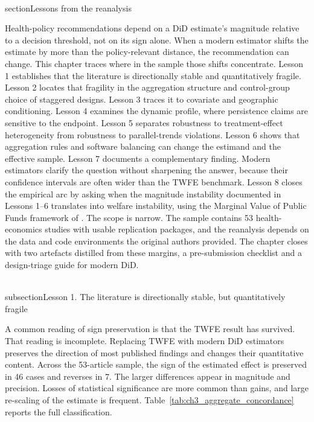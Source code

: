 \documentclass[11pt]{article}
\begin{document}
\\section{Lessons from the reanalysis}
\label{Chapter4}

Health-policy recommendations depend on a DiD estimate's magnitude relative to a decision threshold, not on its sign alone. When a modern estimator shifts the estimate by more than the policy-relevant distance, the recommendation can change. This chapter traces where in the sample those shifts concentrate. Lesson 1 establishes that the literature is directionally stable and quantitatively fragile. Lesson 2 locates that fragility in the aggregation structure and control-group choice of staggered designs. Lesson 3 traces it to covariate and geographic conditioning. Lesson 4 examines the dynamic profile, where persistence claims are sensitive to the endpoint. Lesson 5 separates robustness to treatment-effect heterogeneity from robustness to parallel-trends violations. Lesson 6 shows that aggregation rules and software balancing can change the estimand and the effective sample. Lesson 7 documents a complementary finding. Modern estimators clarify the question without sharpening the answer, because their confidence intervals are often wider than the TWFE benchmark. Lesson 8 closes the empirical arc by asking when the magnitude instability documented in Lessons 1--6 translates into welfare instability, using the Marginal Value of Public Funds framework of \textcite{hendren2020unified}. The scope is narrow. The sample contains 53 health-economics studies with usable replication packages, and the reanalysis depends on the data and code environments the original authors provided. The chapter closes with two artefacts distilled from these margins, a pre-submission checklist and a design-triage guide for modern DiD.

\\subsection{Lesson 1. The literature is directionally stable, but quantitatively fragile}

A common reading of sign preservation is that the TWFE result has survived. That reading is incomplete. Replacing TWFE with modern DiD estimators preserves the direction of most published findings and changes their quantitative content. Across the 53-article sample, the sign of the estimated effect is preserved in 46 cases and reverses in 7. The larger differences appear in magnitude and precision. Losses of statistical significance are more common than gains, and large re-scaling of the estimate is frequent. Table~\ref{tab:ch3_aggregate_concordance} reports the full classification.
\end{document}

